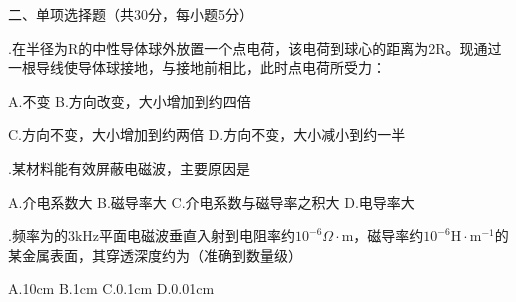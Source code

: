 \noindent
二、\hspace{0.2em}单项选择题（共30分，每小题5分）
\vspace{0.2cm}

.\hspace{0.8em}在半径为R的中性导体球外放置一个点电荷，该电荷到球心的距离为2R。现通过一根导线使导体球接地，与接地前相比，此时点电荷所受力：\vspace{0.2cm}

A.\hspace{0.8em}不变  \hspace{16em} B.\hspace{0.8em}方向改变，大小增加到约四倍

C.\hspace{0.8em}方向不变，大小增加到约两倍 \hspace{5em}  D.\hspace{0.8em}方向不变，大小减小到约一半\vspace{0.2cm}

.\hspace{0.8em}某材料能有效屏蔽电磁波，主要原因是\vspace{0.2cm}

A.\hspace{0.8em}介电系数大 \hspace{1em} 
B.\hspace{0.8em}磁导率大 \hspace{1em} 
C.\hspace{0.8em}介电系数与磁导率之积大 \hspace{1em} 
D.\hspace{0.8em}电导率大\vspace{0.2cm}

.\hspace{0.8em}频率为的3kHz平面电磁波垂直入射到电阻率约$10^{-6} \Omega \cdot \mathrm{m}$，磁导率约$10^{-6} \mathrm{H} \cdot \mathrm{m^{-1}} $的某金属表面，其穿透深度约为（准确到数量级）\vspace{0.2cm}

A.\hspace{0.8em}10cm \hspace{1em} 
B.\hspace{0.8em}1cm \hspace{1em} 
C.\hspace{0.8em}0.1cm \hspace{1em} 
D.\hspace{0.8em}0.01cm\vspace{0.2cm}

